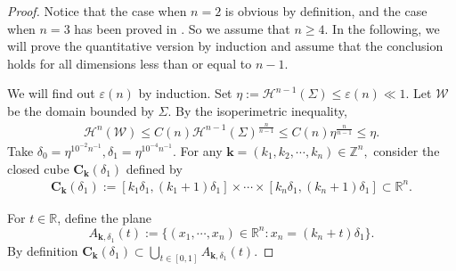 \documentclass[letter]{amsart}
\theoremstyle{definition}
\theoremstyle{remark}
\begin{document}
\begin{proof}
	Notice that the case when $n=2$ is obvious by definition, and the case when $n=3$ has been proved in \cite{DS'23}. So we assume that $n \geq 4$. In the following, we will prove the quantitative version by induction and assume that the conclusion holds for all dimensions less than or equal to $n-1$.

We will find out $\varepsilon (n)$ by induction. 
Set $\eta := \mathcal{H}^{n-1}(\Sigma )\leq  \varepsilon (n) \ll 1$.
Let $\mathcal{W}$ be the domain bounded by $\Sigma $. By the isoperimetric inequality,
\begin{align*}
	\mathcal{H}^n(\mathcal{W}) \leq C(n) \mathcal{H}^{n-1}(\Sigma )^{\frac{n}{n-1}}\leq C(n) \eta^{\frac{n}{n-1}} \leq \eta .
\end{align*}
Take $\delta _0 = \eta^{10^{-2}n^{-1}},\delta_1 = \eta ^{10^{-4} n^{-1}}$. For any $\mathbf{k}= (k_1, k_2, \cdots, k_n) \in \mathbb{Z}^n,$ consider the closed cube $\mathbf{C}_{\mathbf{k}}(\delta_1 )$ defined by
\begin{align*}
	\mathbf{C}_{\mathbf{k}}(\delta_1 ):= [k_1\delta_1 , (k_1+1)\delta_1 ] \times \cdots \times [k_n \delta_1 , (k_n+1)\delta_1 ] \subset \mathbb{R}^n.
\end{align*}

For $t\in\mathbb{R}$, define the plane $$A_{\mathbf{k}, \delta _1}(t):= \{(x_1, \cdots, x_n) \in \mathbb{R}^n: x_n= (k_n +t) \delta _1\}.$$ 
By definition $\mathbf{C}_{\mathbf{k}}(\delta _1) \subset  \bigcup_{t\in[0,1]} A_{\mathbf{k}, \delta _1}(t)$. 



\end{proof}
\end{document}
